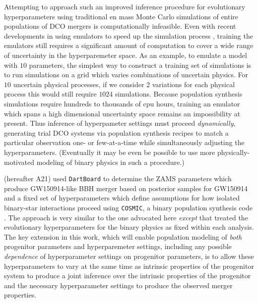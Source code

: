 \documentclass[linenumbers,twocolumn]{aastex631}
\begin{document}
Attempting to approach such an improved inference procedure for evolutionary
hyperparameters using traditional en mass Monte Carlo simulations of entire
populations of DCO mergers is computationally infeasible. Even with recent
developments in using emulators to speed up the simulation process
\citep[e.g.][]{Wong2021}, training the emulators still requires a significant
amount of computation to cover a wide range of uncertainty in the hyperparemeter
space. As an example, to emulate a model with $10$ parameters, the simplest way
to construct a training set of simulations is to run simulations on a grid which
varies combinations of uncertain physics. For $10$ uncertain physical processes,
if we consider $2$ variations for each physical process this would still require
$1024$ simulations. Because population synthesis simulations require hundreds to
thousands of cpu hours, training an emulator which spans a high dimensional
uncertainty space remains an impossibility at present.  Thus inference of
hyperpameter settings must proceed \emph{dynamically}, generating trial DCO
systems via population synthesis recipes to match a particular observation one-
or few-at-a-time while simultaneously adjusting the hyperparameters. (Eventually
it may be even be possible to use more physically-motivated modeling of binary
physics \citep[e.g.][]{Gallego-Garcia2021} in such a procedure.)

\citet{Andrews2021} (hereafter A21) used \texttt{DartBoard} \citep{Andrews2018}
to determine the ZAMS parameters which produce GW150914-like BBH merger based on
posterior samples for GW150914 and a fixed set of hyperparameters which define
assumptions for how isolated binary-star interactions proceed using
\texttt{COSMIC}, a binary population synthesis code \citep{Breivik2020}. The
approach is very similar to the one advocated here \emph{except} that
\citet{Andrews2021} treated the evolutionary hyperparameters for the binary
physics as fixed within each analysis.  The key extension in this work, which
will enable population modeling of \emph{both} progenitor parameters and
hyperparemeter settings, including any possible \emph{dependence} of
hyperparameter settings on progenitor parameters, is to allow these
hyperparameters to vary at the same time as intrinsic properties of the
progenitor system to produce a joint inference over the intrinsic properties of
the progenitor and the necessary hyperparameter settings to produce the observed
merger properties.
\end{document}
